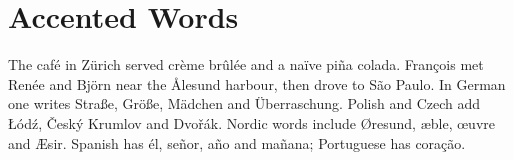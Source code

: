 \documentclass[11pt]{article}
\begin{document}
\section*{Accented Words}
The caf\'e in Z\"urich served cr\`eme br\^ul\'ee and a na\"ive pi\~na colada.
Fran\c{c}ois met Ren\'ee and Bj\"orn near the \AA{}lesund harbour, then drove to S\~ao Paulo.
In German one writes Stra\ss{}e, Gr\"o\ss{}e, M\"adchen and \"Uberraschung.
Polish and Czech add \L{}\'od\'z, \v{C}esk\'y Krumlov and Dvo\v{r}\'ak.
Nordic words include \O{}resund, \ae{}ble, \oe{}uvre and \AE{}sir.
Spanish has \'el, se\~nor, a\~no and ma\~nana; Portuguese has cora\c{c}\~ao.
\end{document}
